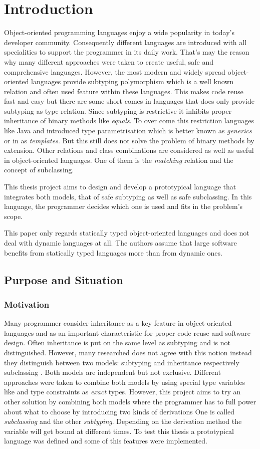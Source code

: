 \chapter{Introduction}
Object-oriented programming languages enjoy a wide popularity in today's
developer community. Consequently different languages are introduced with
all specialities to support the programmer in its daily work. That's may
the reason why many different approaches were taken to create useful, safe
and comprehensive languages. However, the most modern and widely spread
object-oriented languages provide subtyping polymorphism which is a well
known relation and often used feature within these languages. This makes
code reuse fast and easy but there are some short comes in languages
that does only provide subtyping as type relation. Since subtyping
is restrictive it inhibits proper inheritance of binary methods like
\emph{equals}. To over come this restriction languages like Java and \cs
introduced type parametrisation which is better known as \emph{generics}
or in \cpp as \emph{templates}. But this still does not solve the problem
of binary methods by extension. Other relations and class combinations
are considered as well as useful in object-oriented languages. One of them
is the \emph{matching} relation and the concept of subclassing.

This thesis project aims to design and develop a prototypical language
that integrates both models, that of safe subtyping as well as safe
subclassing. In this language, the programmer decides which one is used
and fits in the problem's scope.

This paper only regards statically typed object-oriented languages and does
not deal with dynamic languages at all. The authors assume that large
software benefits from statically typed languages more than from dynamic
ones.

\section{Purpose and Situation}
\subsection{Motivation}
Many programmer consider inheritance as a key feature in object-oriented
languages and as an important characteristic for proper code reuse and
software design. Often inheritance is put on the same level as subtyping
and is not distinguished. However, many researched does not agree with
this notion instead they distinguish between two models: subtyping and
inheritance respectively subclassing \cite{taivalsaari_notion_1996}.
Both models are independent but not exclusive. Different approaches were
taken to combine both models by using special type variables like \mytype
and type constraints as \emph{exact} types. However, this project aims to
try an other solution by combining both models where the programmer has
to full power about what to choose by introducing two kinds of derivations
One is called \emph{subclassing} and the other \emph{subtyping}. Depending
on the derivation method the \mytype variable will get bound at different
times. To test this thesis a prototypical language was defined and some
of this features were implemented.

